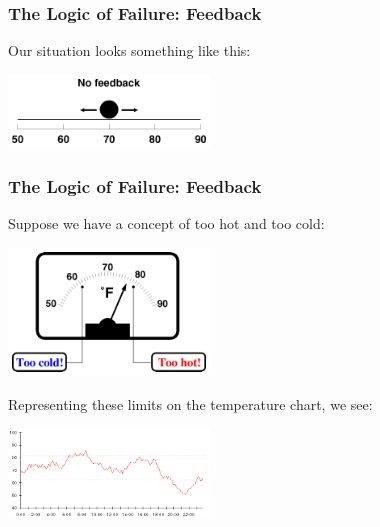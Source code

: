 \begin{frame}
\frametitle{The Logic of Failure: Feedback}
\begin{changemargin}{1cm}
Our situation looks something like this:
\begin{center}
	\includegraphics[width=0.4\textwidth]{images/nofeedback.png}
\end{center}

\end{changemargin}
\end{frame}

\begin{frame}
\frametitle{The Logic of Failure: Feedback}
\begin{changemargin}{1cm}
Suppose we have a concept of too hot and too cold:
\begin{center}
	\includegraphics[width=0.4\textwidth]{images/temperature-hotcold.png}
\end{center}

Representing these limits on the temperature chart, we see:

\begin{center}
	\includegraphics[width=0.4\textwidth]{images/temperature-chart-hotcold.png}
\end{center}

\end{changemargin}
\end{frame}

